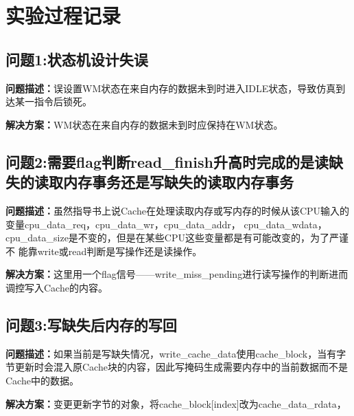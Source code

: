 \section{实验过程记录}
\subsection{问题1:状态机设计失误}
\textbf{问题描述：}误设置WM状态在来自内存的数据未到时进入IDLE状态，导致仿真到达某一指令后锁死。

\textbf{解决方案：}WM状态在来自内存的数据未到时应保持在WM状态。
\subsection{问题2:需要flag判断read\_finish升高时完成的是读缺失的读取内存事务还是写缺失的读取内存事务}
\textbf{问题描述：}虽然指导书上说Cache在处理读取内存或写内存的时候从该CPU输入的变量cpu\_data\_req，cpu\_data\_wr，cpu\_data\_addr，
cpu\_data\_wdata，cpu\_data\_size是不变的，但是在某些CPU这些变量都是有可能改变的，为了严谨不
能靠write或read判断是写操作还是读操作。

\textbf{解决方案：}这里用一个flag信号——write\_miss\_pending进行读写操作的判断进而调控写入Cache的内容。
\subsection{问题3:写缺失后内存的写回}
\textbf{问题描述：}如果当前是写缺失情况，write\_cache\_data使用cache\_block，当有字节更新时会混入原Cache块的内容，因此写掩码生成需要内存中的当前数据而不是Cache中的数据。

\textbf{解决方案：}变更更新字节的对象，将cache\_block[index]改为cache\_data\_rdata，